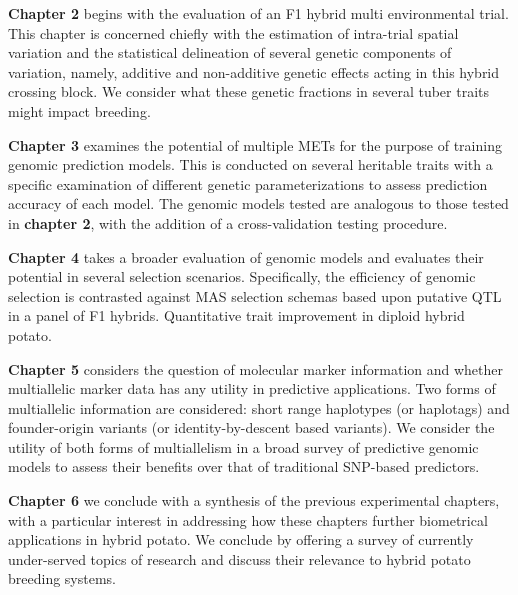 \documentclass[
]{article}
\begin{document}
\textbf{Chapter 2} begins with the evaluation of an F1 hybrid multi
environmental trial. This chapter is concerned chiefly with the
estimation of intra-trial spatial variation and the statistical
delineation of several genetic components of variation, namely, additive
and non-additive genetic effects acting in this hybrid crossing block.
We consider what these genetic fractions in several tuber traits might
impact breeding.

\textbf{Chapter 3} examines the potential of multiple METs for the
purpose of training genomic prediction models. This is conducted on
several heritable traits with a specific examination of different
genetic parameterizations to assess prediction accuracy of each model.
The genomic models tested are analogous to those tested in
\textbf{chapter 2}, with the addition of a cross-validation testing
procedure.

\textbf{Chapter 4} takes a broader evaluation of genomic models and
evaluates their potential in several selection scenarios. Specifically,
the efficiency of genomic selection is contrasted against MAS selection
schemas based upon putative QTL in a panel of F1 hybrids. Quantitative
trait improvement in diploid hybrid potato.

\textbf{Chapter 5} considers the question of molecular marker
information and whether multiallelic marker data has any utility in
predictive applications. Two forms of multiallelic information are
considered: short range haplotypes (or haplotags) and founder-origin
variants (or identity-by-descent based variants). We consider the
utility of both forms of multiallelism in a broad survey of predictive
genomic models to assess their benefits over that of traditional
SNP-based predictors.

\textbf{Chapter 6} we conclude with a synthesis of the previous
experimental chapters, with a particular interest in addressing how
these chapters further biometrical applications in hybrid potato. We
conclude by offering a survey of currently under-served topics of
research and discuss their relevance to hybrid potato breeding systems.


\printbibliography
\end{document}
